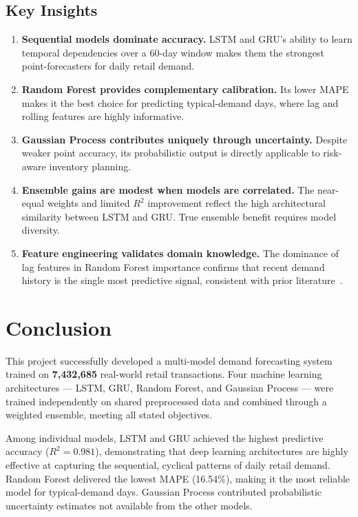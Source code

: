 \documentclass[12pt, a4paper]{article}
\begin{document}
\subsection{Key Insights}
\label{subsec:insights}

\begin{enumerate}[leftmargin=*, label=(\arabic*)]
    \item \textbf{Sequential models dominate accuracy.} LSTM and GRU's ability to learn
          temporal dependencies over a 60-day window makes them the strongest
          point-forecasters for daily retail demand.
    \item \textbf{Random Forest provides complementary calibration.} Its lower MAPE makes
          it the best choice for predicting typical-demand days, where lag and rolling
          features are highly informative.
    \item \textbf{Gaussian Process contributes uniquely through uncertainty.} Despite weaker
          point accuracy, its probabilistic output is directly applicable to risk-aware
          inventory planning.
    \item \textbf{Ensemble gains are modest when models are correlated.} The near-equal
          weights and limited $R^{2}$ improvement reflect the high architectural similarity
          between LSTM and GRU. True ensemble benefit requires model diversity.
    \item \textbf{Feature engineering validates domain knowledge.} The dominance of lag
          features in Random Forest importance confirms that recent demand history is the
          single most predictive signal, consistent with prior literature~\cite{hyndman2021}.
\end{enumerate}

\newpage
\section{Conclusion}
\label{sec:conclusion}

This project successfully developed a multi-model demand forecasting system trained on
\textbf{7,432,685} real-world retail transactions. Four machine learning architectures ---
LSTM, GRU, Random Forest, and Gaussian Process --- were trained independently on shared
preprocessed data and combined through a weighted ensemble, meeting all stated objectives.

Among individual models, LSTM and GRU achieved the highest predictive accuracy
($R^{2} = 0.981$), demonstrating that deep learning architectures are highly effective at
capturing the sequential, cyclical patterns of daily retail demand. Random Forest delivered
the lowest MAPE (16.54\%), making it the most reliable model for typical-demand days.
Gaussian Process contributed probabilistic uncertainty estimates not available from the
other models.
\end{document}
